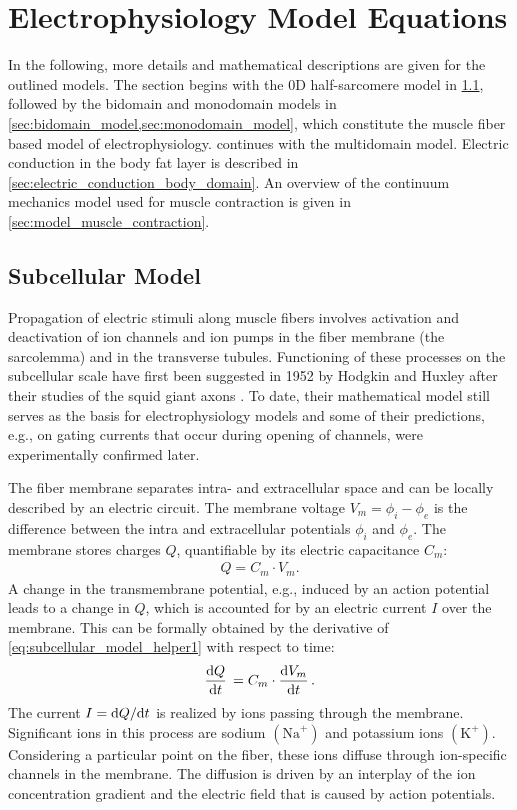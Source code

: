 \section{Electrophysiology Model Equations}\label{sec:model_equations}
In the following, more details and mathematical descriptions are given for the outlined models. The section begins with the 0D half-sarcomere model in \cref{sec:subcelullar_model}, followed by the bidomain and monodomain models in \cref{sec:bidomain_model,sec:monodomain_model}, which constitute the muscle fiber based model of electrophysiology.  continues with the multidomain model. Electric conduction in the body fat layer is described in \cref{sec:electric_conduction_body_domain}. An overview of the continuum mechanics model used for muscle contraction is given in \cref{sec:model_muscle_contraction}.
\subsection{Subcellular Model}\label{sec:subcelullar_model}

Propagation of electric stimuli along muscle fibers involves activation and deactivation of ion channels and ion pumps in the fiber membrane  (the sarcolemma) and in the transverse tubules.
Functioning of these processes on the subcellular scale have first been suggested in 1952 by Hodgkin and Huxley after their studies of the squid giant axons \cite{Hodgkin1952,hodgkin1952propagation}. To date, their mathematical model still serves as the basis for electrophysiology models and some of their predictions, e.g., on gating currents that occur during opening of channels, were experimentally confirmed later.

The fiber membrane separates intra- and extracellular space and can be locally described by an electric circuit. The membrane voltage $V_m=\phi_i-\phi_e$ is the difference between the intra and extracellular potentials $\phi_i$ and $\phi_e$. The membrane stores charges $Q$, quantifiable by its electric capacitance $C_m$:
\begin{align}\label{eq:subcellular_model_helper1}
  Q = C_m\cdot V_m.  
\end{align}
%
A change in the transmembrane potential, e.g., induced by an action potential leads to a change in $Q$, which is accounted for by an electric current $I$ over the membrane. This can be formally obtained by the derivative of \cref{eq:subcellular_model_helper1} with respect to time:%
\begin{align}\label{eq:subcellular_model_helper2}
  \d{Q}{t} = C_m \cdot \d{V_m}{t}.
\end{align}
%
The current $I=\d Q / \d t$ is realized by ions passing through the membrane.
Significant ions in this process are sodium $(\text{Na}^{+})$ and potassium ions $(\text{K}^{+})$.
Considering a particular point on the fiber, these ions diffuse through ion-specific channels in the membrane.
The diffusion is driven by an interplay of the ion concentration gradient and the electric field that is caused by action potentials.

